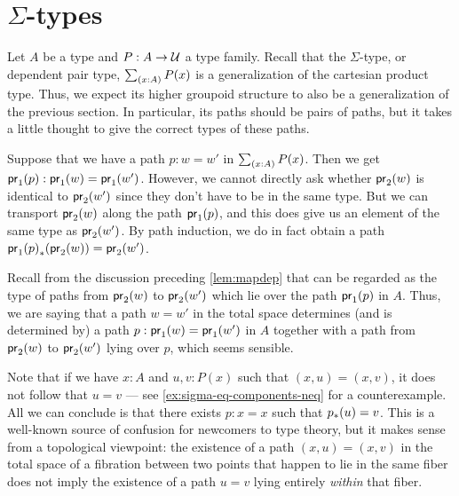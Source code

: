 %

\section{\texorpdfstring{$\Sigma$}{Σ}-types}
\label{sec:compute-sigma}

%
Let $A$ be a type and $P:A\to\mathcal{U}$ a type family.
Recall that the $\Sigma$-type, or dependent pair type, $\sm{x:A} P(x)$ is a generalization of the cartesian product type.
Thus, we expect its higher groupoid structure to also be a generalization of the previous section.
In particular, its paths should be pairs of paths, but it takes a little thought to give the correct types of these paths.

Suppose that we have a path $p:w=w'$ in $\sm{x:A}P(x)$.
Then we get ${\mathsf{pr}_{1}}\mathopen{}\left({p}\right)\mathclose{}:\mathsf{pr}_{1}(w)=\mathsf{pr}_{1}(w')$.
However, we cannot directly ask whether $\mathsf{pr}_{2}(w)$ is identical to $\mathsf{pr}_{2}(w')$ since they don't have to be in the same type.
But we can transport $\mathsf{pr}_{2}(w)$ along the path ${\mathsf{pr}_{1}}\mathopen{}\left({p}\right)\mathclose{}$, and this does give us an element of the same type as $\mathsf{pr}_{2}(w')$.
By path induction, we do in fact obtain a path ${{\mathsf{pr}_{1}}\mathopen{}\left({p}\right)\mathclose{}}_{*}\mathopen{}\left({\mathsf{pr}_{2}(w)}\right)\mathclose{}=\mathsf{pr}_{2}(w')$.

Recall from the discussion preceding \cref{lem:mapdep} that
can be regarded as the type of paths from $\mathsf{pr}_{2}(w)$ to $\mathsf{pr}_{2}(w')$ which lie over the path ${\mathsf{pr}_{1}}\mathopen{}\left({p}\right)\mathclose{}$ in $A$.
%
%
Thus, we are saying that a path $w=w'$ in the total space determines (and is determined by) a path $p:\mathsf{pr}_{1}(w)=\mathsf{pr}_{1}(w')$ in $A$ together with a path from $\mathsf{pr}_{2}(w)$ to $\mathsf{pr}_{2}(w')$ lying over $p$, which seems sensible.

\begin{rmk}\label{rmk:sigma-equality-extraction}
  Note that if we have $x:A$ and $u,v:P(x)$ such that $(x,u)=(x,v)$, it does not follow that $u=v$ --- see \cref{ex:sigma-eq-components-neq} for a counterexample.
  All we can conclude is that there exists $p:x=x$ such that ${p}_{*}\mathopen{}\left({u}\right)\mathclose{} = v$.
  This is a well-known source of confusion for newcomers to type theory, but it makes sense from a topological viewpoint: the existence of a path $(x,u)=(x,v)$ in the total space of a fibration between two points that happen to lie in the same fiber does not imply the existence of a path $u=v$ lying entirely \emph{within} that fiber.
\end{rmk}

